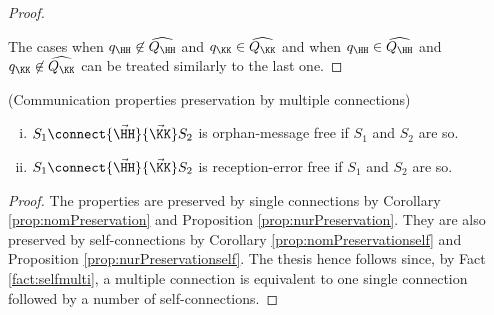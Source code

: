 \begin{proof}
\begin{description}
\begin{description}
\end{description}

 \end{description}
 
 \noindent
The cases when ${q}_\HH\not\in \widehat{Q_\HH}$ and ${q}_\KK\in \widehat{Q_\KK}$ and 
when 
${q}_\HH\in \widehat{Q_\HH}$ and ${q}_\KK\not\in \widehat{Q_\KK}$ can be treated similarly to the last one.



\end{proof}

 \begin{corollary}(Communication properties preservation by multiple connections)
\begin{enumerate}[i)]
\item
$S_1\connect{\vec{\HH}}{\vec{\KK}}S_2$ is orphan-message free  if $S_1$ and $S_2$ are so.
\item
 $S_1\connect{\vec{\HH}}{\vec{\KK}}S_2$ is reception-error free  if $S_1$ and $S_2$ are so.
 \end{enumerate}
 \end{corollary}
 \begin{proof}
The properties are preserved by single connections by Corollary \ref{prop:nomPreservation} and Proposition \ref{prop:nurPreservation}. They are also preserved by self-connections by Corollary \ref{prop:nomPreservationself} and Proposition \ref{prop:nurPreservationself}. The thesis hence follows since, by Fact  \ref{fact:selfmulti}, a multiple connection is equivalent to one single connection followed by a number of self-connections.
 \end{proof}
 
 
 
